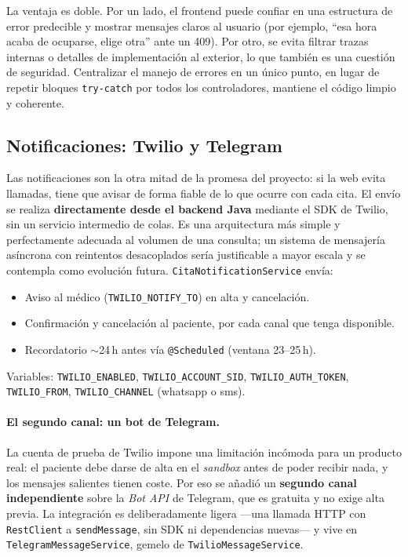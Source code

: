 \documentclass[12pt,a4paper]{report}
\begin{document}
La ventaja es doble. Por un lado, el frontend puede confiar en una estructura de error predecible y mostrar mensajes claros al usuario (por ejemplo, ``esa hora acaba de ocuparse, elige otra'' ante un 409). Por otro, se evita filtrar trazas internas o detalles de implementación al exterior, lo que también es una cuestión de seguridad. Centralizar el manejo de errores en un único punto, en lugar de repetir bloques \texttt{try-catch} por todos los controladores, mantiene el código limpio y coherente.

\subsection{Notificaciones: Twilio y Telegram}

Las notificaciones son la otra mitad de la promesa del proyecto: si la web evita llamadas, tiene que avisar de forma fiable de lo que ocurre con cada cita. El envío se realiza \textbf{directamente desde el backend Java} mediante el SDK de Twilio, sin un servicio intermedio de colas. Es una arquitectura más simple y perfectamente adecuada al volumen de una consulta; un sistema de mensajería asíncrona con reintentos desacoplados sería justificable a mayor escala y se contempla como evolución futura. \texttt{CitaNotificationService} envía:
\begin{itemize}
  \item Aviso al médico (\texttt{TWILIO\_NOTIFY\_TO}) en alta y cancelación.
  \item Confirmación y cancelación al paciente, por cada canal que tenga disponible.
  \item Recordatorio $\sim$24\,h antes vía \texttt{@Scheduled} (ventana 23--25\,h).
\end{itemize}

Variables: \texttt{TWILIO\_ENABLED}, \texttt{TWILIO\_ACCOUNT\_SID}, \texttt{TWILIO\_AUTH\_TOKEN}, \texttt{TWILIO\_FROM}, \texttt{TWILIO\_CHANNEL} (whatsapp o sms).

\paragraph{El segundo canal: un bot de Telegram.} La cuenta de prueba de Twilio impone una limitación incómoda para un producto real: el paciente debe darse de alta en el \emph{sandbox} antes de poder recibir nada, y los mensajes salientes tienen coste. Por eso se añadió un \textbf{segundo canal independiente} sobre la \emph{Bot API} de Telegram, que es gratuita y no exige alta previa. La integración es deliberadamente ligera —una llamada HTTP con \texttt{RestClient} a \texttt{sendMessage}, sin SDK ni dependencias nuevas— y vive en \texttt{TelegramMessageService}, gemelo de \texttt{TwilioMessageService}.
\end{document}
